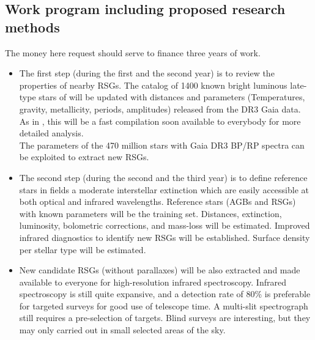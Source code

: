 \documentclass[final,11pt,onecolumn,a4paper,twoside]{scrbook_gj}
\begin{document}
\subsection{ Work program including proposed research methods}
The money here request should serve to 
finance three years of work.
\begin{itemize}
\item
The first step (during the first and the second year) is to review the 
properties of nearby RSGs.
The catalog of 1400 known bright luminous late-type stars of 
\citet{messineo19} will be updated with
distances and parameters 
(Temperatures, gravity, metallicity, periods, amplitudes) 
released from the DR3 Gaia data. 
As in \citet{messineo19}, this will be a fast compilation
soon available to everybody for more detailed analysis.\\
The parameters of the 470 million stars with Gaia DR3 BP/RP spectra
can be exploited to extract new RSGs.\\
\item
The second step (during the second and the third year) 
is to define reference stars in fields
a moderate interstellar extinction
which are easily accessible at both optical and 
infrared wavelengths. 
Reference stars (AGBs and RSGs) with known parameters 
will be the training set.  
Distances, extinction, luminosity, bolometric corrections,
and mass-loss will be estimated.
Improved infrared diagnostics to identify new RSGs will be established.
Surface density per stellar type will be estimated.\\
\item

New candidate RSGs (without parallaxes) 
will be also extracted and made available to everyone 
for high-resolution infrared spectroscopy.
Infrared spectroscopy is still quite expansive, 
and a detection rate of 80\% is  preferable 
for targeted surveys for  good use of telescope time. 
A multi-slit spectrograph
still requires a pre-selection of targets.
Blind surveys are interesting, but they may only carried out 
in  small selected areas of the sky.
\end{itemize}
 
\end{document}
